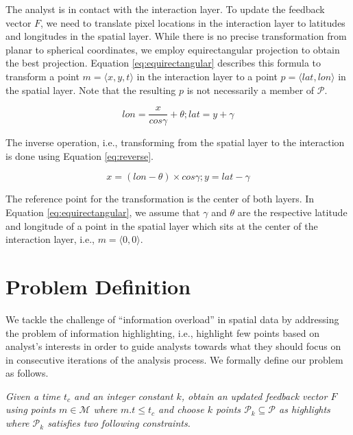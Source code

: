 \documentclass{vldb}
\begin{document}
\vspace{2pt}
The analyst is in contact with the interaction layer. To update the feedback vector $F$, we need to translate pixel locations in the interaction layer to latitudes and longitudes in the spatial layer. While there is no precise transformation from planar to spherical coordinates, we employ equirectangular projection to obtain the best projection. Equation \ref{eq:equirectangular} describes this formula to transform a point $m = \langle x,y,t \rangle$ in the interaction layer to a point $p = \langle lat, lon \rangle$ in the spatial layer. Note that the resulting $p$ is not necessarily a member of $\mathcal{P}$. 

\begin{equation}\label{eq:equirectangular}
\mathit{lon} = \frac{x}{\mathit{cos}\gamma} + \theta; \mathit{lat} = y + \gamma 
\end{equation}

The inverse operation, i.e., transforming from the spatial layer to the interaction is done using Equation \ref{eq:reverse}.

\begin{equation}\label{eq:reverse}
x = (\mathit{lon} - \theta) \times \mathit{cos}\gamma; y = \mathit{lat} - \gamma
\end{equation}

\vspace{2pt}
The reference point for the transformation is the center of both layers. In Equation \ref{eq:equirectangular}, we assume that $\gamma$ and $\theta$ are the respective latitude and longitude of a point in the spatial layer which sits at the center of the interaction layer, i.e., $m= \langle 0,0 \rangle$.
\bigskip
\section{Problem Definition}
We tackle the challenge of ``information overload'' in spatial data by addressing the problem of information highlighting, i.e., highlight few points based on analyst's interests in order to guide analysts towards what they should focus on in consecutive iterations of the analysis process. We formally define our problem as follows.

\vspace{2pt}
 {\em Given a time $t_c$ and an integer constant $k$, obtain an updated feedback vector $F$ using points $m \in \mathcal{M}$ where $m.t \leq t_c$ and choose $k$ points $\mathcal{P}_k \subseteq \mathcal{P}$ as highlights where $\mathcal{P}_k$ satisfies two following constraints.}
\end{document}

